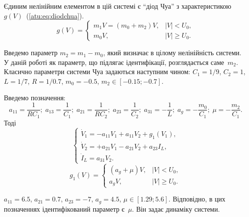 \documentclass[a4paper,13pt]{atuaref}
\begin{document}
Єдиним нелінійним елементом в цій системі є ``діод Чуа'' з характеристикою
$g(V)$~(\ref{atu:eq:diodchua}).
%
%
\begin{equation}
g(V) =
\begin{cases}
  m_1 V = ( m_0 + m_2 ) V , & |V| <   U_0, \\
  m_0 V ,                   & |V| \ge U_0.
\end{cases}
\label{atu:eq:diodchua}
\end{equation}

Введемо параметр \(m_2 = m_1 - m_0 \), який визначає в цілому нелінійність
системи. У даній роботі як параметр, що підлягає ідентифікації, розглядається саме~$m_2$.
Класично параметри системи Чуа задаються наступним чином:
$C_1 = 1/9$, $C_2 = 1$, $L= 1/7$, $R = 1/0.7$, $m_0=-0.5$, $ m_2 \in [ -0.15; -0.7 ] $.

Введемо позначення:
\[
  a_{11} = \frac{1}{R C_1}; \;
  a_{13} = \frac{1}{C_1}; \;
  a_{21} = \frac{1}{R C_2}; \;
  a_{23} = \frac{1}{C_2}; \;
  a_{31} = -\frac{1}{L}; \;
  a_g = - \frac{m_0}{C_1}; \;
  \mu = - \frac{m_2}{C_1}.
\]
%
Тоді
%
\begin{equation}
\begin{cases}
  \dot{V}_1  = -a_{11} V_1 + a_{11}  V_2  + g_1(V_1) , \\
  \dot{V}_2  = +a_{21} V_1 - a_{21}  V_2  + a_{23} I_L    , \\
  \dot{I}_L  =  a_{31} V_2.
\end{cases}
\label{atu:eq:chua2}
\end{equation}
%
%
\begin{equation}
g_1(V) =
\begin{cases}
  ( a_g + \mu ) V , & |V| <   U_0, \\
  a_g V           , & |V| \ge U_0.
\end{cases}
\label{atu:eq:diodchua2}
\end{equation}

\noindent
$a_{11} = 6.5$,
$a_{21} = 0.7$,
$a_{23} = -7$,
$a_g = 4.5$,
$\mu \in [ 1.29 ; 5.6 ]$.
Відповідно, в цих позначеннях ідентифікований параметр є~$\mu$.
Він задає динаміку системи.
%
\end{document}
